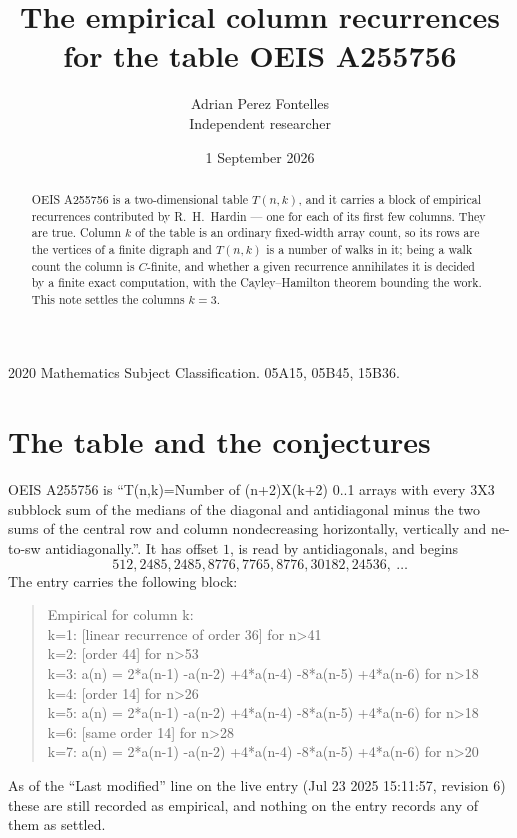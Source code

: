 \documentclass[11pt,a4paper]{article}
\title{The empirical column recurrences for the table OEIS A255756}
\author{Adrian Perez Fontelles\\ \small Independent researcher}
\date{1 September 2026}
\theoremstyle{plain}
\theoremstyle{definition}
\begin{document}
\maketitle

\begin{abstract}
OEIS A255756 is a two-dimensional table $T(n,k)$, and it carries a block of empirical
recurrences contributed by R.~H.~Hardin --- one for each of its first few columns. They are
true. Column $k$ of the table is an ordinary fixed-width array count, so its rows are the
vertices of a finite digraph and $T(n,k)$ is a number of walks in it; being a walk count the
column is $C$-finite, and whether a given recurrence annihilates it is decided by a finite
exact computation, with the Cayley--Hamilton theorem bounding the work. This note settles the columns $k=3$.
\end{abstract}

\noindent\small 2020 Mathematics Subject Classification. 05A15, 05B45, 15B36.\normalsize

\section{The table and the conjectures}

OEIS A255756 is ``T(n,k)=Number of (n+2)X(k+2) 0..1 arrays with every 3X3 subblock sum of the medians of the diagonal and antidiagonal minus the two sums of the central row and column nondecreasing horizontally, vertically and ne-to-sw antidiagonally.''. It has offset $1$, is
read by antidiagonals, and begins
\[
512, 2485, 2485, 8776, 7765, 8776, 30182, 24536,\ \dots
\]
The entry carries the following block:
\begin{quote}\small
Empirical for column k:\\
k=1: [linear recurrence of order 36] for n>41\\
k=2: [order 44] for n>53\\
k=3: a(n) = 2*a(n-1) -a(n-2) +4*a(n-4) -8*a(n-5) +4*a(n-6) for n>18\\
k=4: [order 14] for n>26\\
k=5: a(n) = 2*a(n-1) -a(n-2) +4*a(n-4) -8*a(n-5) +4*a(n-6) for n>18\\
k=6: [same order 14] for n>28\\
k=7: a(n) = 2*a(n-1) -a(n-2) +4*a(n-4) -8*a(n-5) +4*a(n-6) for n>20\\
\end{quote}
As of the ``Last modified'' line on the live entry (Jul 23 2025 15:11:57, revision 6) these are still
recorded as empirical, and nothing on the entry records any of them as settled.
\end{document}
